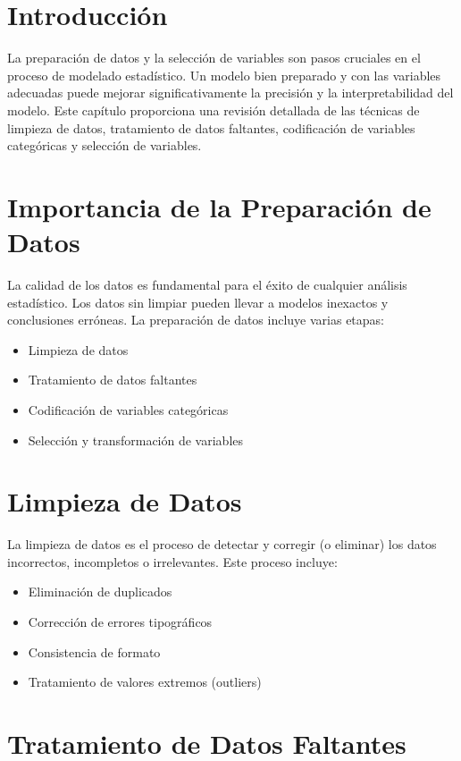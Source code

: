 

\section{Introducci\'on}

La preparaci\'on de datos y la selecci\'on de variables son pasos cruciales en el proceso de modelado estad\'istico. Un modelo bien preparado y con las variables adecuadas puede mejorar significativamente la precisi\'on y la interpretabilidad del modelo. Este cap\'itulo proporciona una revisi\'on detallada de las t\'ecnicas de limpieza de datos, tratamiento de datos faltantes, codificaci\'on de variables categ\'oricas y selecci\'on de variables.

\section{Importancia de la Preparaci\'on de Datos}

La calidad de los datos es fundamental para el \'exito de cualquier an\'alisis estad\'istico. Los datos sin limpiar pueden llevar a modelos inexactos y conclusiones err\'oneas. La preparaci\'on de datos incluye varias etapas:
\begin{itemize}
    \item Limpieza de datos
    \item Tratamiento de datos faltantes
    \item Codificaci\'on de variables categ\'oricas
    \item Selecci\'on y transformaci\'on de variables
\end{itemize}

\section{Limpieza de Datos}

La limpieza de datos es el proceso de detectar y corregir (o eliminar) los datos incorrectos, incompletos o irrelevantes. Este proceso incluye:
\begin{itemize}
    \item Eliminaci\'on de duplicados
    \item Correcci\'on de errores tipogr\'aficos
    \item Consistencia de formato
    \item Tratamiento de valores extremos (outliers)
\end{itemize}

\section{Tratamiento de Datos Faltantes}


